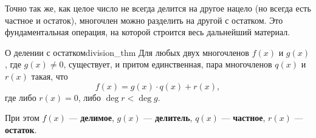 \documentclass[12pt,a4paper]{article}
\begin{document}
Точно так же, как целое число не всегда делится на другое нацело
(но всегда есть частное и остаток), многочлен можно разделить на
другой с остатком. Это фундаментальная операция, на которой строится
весь дальнейший материал.

\begin{theorem}{О делении с остатком}{division_thm}
  Для любых двух многочленов $f(x)$ и $g(x)$, где $g(x) \neq 0$,
  существует, и притом единственная, пара многочленов $q(x)$ и $r(x)$
  такая, что
  \begin{equation}
    f(x) = g(x) \cdot q(x) + r(x), \tag{13.1} \label{eq:division}
  \end{equation}
  где либо $r(x) = 0$, либо $\deg r < \deg g$.

  При этом $f(x)$ — \textbf{делимое}, $g(x)$ — \textbf{делитель},
  $q(x)$ — \textbf{частное}, $r(x)$ — \textbf{остаток}.
\end{theorem}
\end{document}

